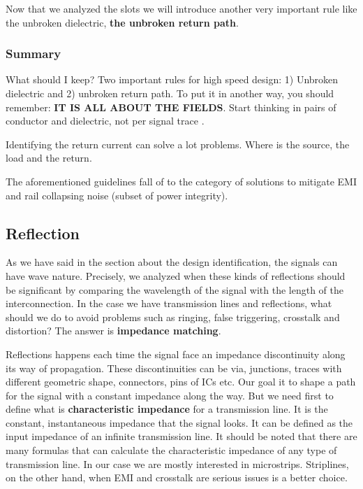 \documentclass[final]{cubedoc}
\begin{document}
	Now that we analyzed the slots we will introduce another very important rule like the unbroken dielectric, \textbf{the unbroken return path}.
	
	
	\subsubsection{Summary}
	
	What should I keep? Two important rules for high speed design: 1) Unbroken dielectric and 2) unbroken return path.
	To put it in another way, you should remember: \textbf{IT IS ALL ABOUT THE FIELDS}. Start thinking in pairs of conductor and dielectric, not per signal trace \cite{morrison2002fields}.
	
	Identifying the return current can solve a lot problems. Where is the source, the load and the return.
	
	
	The aforementioned guidelines fall of to the category of solutions to mitigate EMI and rail collapsing noise (subset of power integrity).
	
	\subsection{Reflection}
	
	As we have said in the section about the design identification, the signals can have wave nature. Precisely, we analyzed when these kinds of reflections should be significant by comparing the wavelength of the signal with the length of the interconnection. In the case we have transmission lines and reflections, what should we do to avoid problems such as ringing, false triggering, crosstalk and distortion? The answer is \textbf{impedance matching}.
	
	Reflections happens each time the signal face an impedance discontinuity along its way of propagation. These discontinuities can be via, junctions, traces with different geometric shape, connectors, pins of ICs etc. Our goal it to shape a path for the signal with a constant impedance along the way. But we need first to define what is \textbf{characteristic impedance} for a transmission line. It is the constant, instantaneous impedance that the signal looks. It can be defined as the input impedance of an infinite transmission line. It should be noted that there are many formulas that can calculate the characteristic impedance of any type of transmission line. In our case we are mostly interested in microstrips. Striplines, on the other hand, when EMI and crosstalk are serious issues is a better choice.
	
\end{document}
